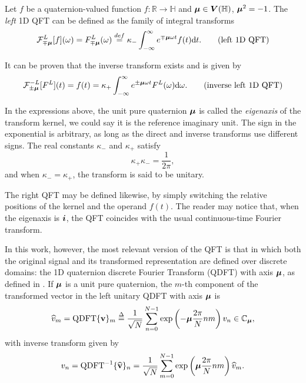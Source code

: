 Let $f$ be a quaternion-valued function $f: \mathbb{R} \rightarrow \mathbb{H}$ and $\boldsymbol{\mu} \in \boldsymbol{V}(\mathbb{H})$, $\boldsymbol{\mu}^2 = -1$. The \textit{left} 1D QFT can be defined as the family of integral transforms
\begin{equation}
    \mathcal{F}^L_{\mp \boldsymbol{\mu}}[f](\omega) =
    F^L_{\mp \boldsymbol{\mu}}(\omega) \overset{def}{=}
    \kappa_{-} \int_{-\infty}^{\infty} e^{\mp \boldsymbol{\mu} \omega t} f(t) \mathrm{d}t.
    \tag{left 1D QFT}
\end{equation}

It can be proven that the inverse transform exists and is given by
\begin{equation}
    \mathcal{F}^{-L}_{\pm \boldsymbol{\mu}}[F^L](t) =
    f(t) =
    \kappa_{+} \int_{-\infty}^{\infty} e^{\pm \boldsymbol{\mu} \omega t} F^L(\omega) \mathrm{d}\omega.
    \tag{inverse left 1D QFT}
\end{equation}

In the expressions above, the unit pure quaternion $\boldsymbol{\mu}$ is called the \emph{eigenaxis} of the transform kernel, we could say it is the reference imaginary unit. The sign in the exponential is arbitrary, as long as the direct and inverse transforms use different signs. The real constants $\kappa_{-}$ and $\kappa_{+}$ satisfy
\begin{equation}
    \kappa_{+} \kappa_{-} = \frac{1}{2\pi},
\end{equation}
\noindent and when $\kappa_{-} = \kappa_{+}$, the transform is said to be unitary.

The right QFT may be defined likewise, by simply switching the relative positions of the kernel and the operand $f(t)$. The reader may notice that, when the eigenaxis is $\boldsymbol{i}$, the QFT coincides with the usual continuous-time Fourier transform.

In this work, however, the most relevant version of the QFT is that in which both the original signal and its transformed representation are defined over discrete domains: the 1D quaternion discrete Fourier Transform (QDFT) with axis $ \boldsymbol{\mu} $, as defined in \cite[sec. 3.3.1]{ell2014quaternion}. If $ \boldsymbol{\mu} $ is a unit pure quaternion, the $ m $-th component of the transformed vector in the left unitary QDFT with axis $ \boldsymbol{\mu} $ is
\begin{equation}
    \label{eq:QDFT_fwd}
    \widehat{v}_m = \text{QDFT}\{ \mathbf{v} \}_m \overset{\Delta}{=} \frac{1}{\sqrt{N}} \sum_{n=0}^{N-1}  \exp \left( -\boldsymbol{\mu} \frac{2\pi}{N} nm \right) v_n \in \mathbb{C}_{\boldsymbol{\mu}},
\end{equation}
with inverse transform given by
\begin{equation}
    \label{eq:QDFT_inv}
    v_n = \text{QDFT}^{-1}\{ \widehat{\mathbf{v}} \}_n = \frac{1}{\sqrt{N}}\sum_{m=0}^{N-1}  \exp \left( \boldsymbol{\mu} \frac{2\pi}{N} nm \right) \widehat{v}_m.
\end{equation}

